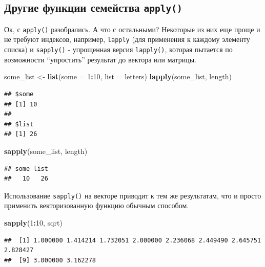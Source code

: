 \documentclass[
]{book}
\newenvironment{Shaded}{\begin{snugshade}}{\end{snugshade}}
\newcommand{\DataTypeTok}[1]{\textcolor[rgb]{0.13,0.29,0.53}{#1}}
\newcommand{\DecValTok}[1]{\textcolor[rgb]{0.00,0.00,0.81}{#1}}
\newcommand{\KeywordTok}[1]{\textcolor[rgb]{0.13,0.29,0.53}{\textbf{#1}}}
\newcommand{\NormalTok}[1]{#1}
\newcommand{\OperatorTok}[1]{\textcolor[rgb]{0.81,0.36,0.00}{\textbf{#1}}}
\newcommand{\StringTok}[1]{\textcolor[rgb]{0.31,0.60,0.02}{#1}}
\begin{document}
\hypertarget{apply_other}{%
\subsection{\texorpdfstring{Другие функции семейства \texttt{apply()}}{Другие функции семейства apply()}}\label{apply_other}}

Ок, с \texttt{apply()} разобрались. А что с остальными? Некоторые из них еще проще и не требуют индексов, например, \texttt{lapply} (для применения к каждому элементу списка) и \texttt{sapply()} - упрощенная версия \texttt{lapply()}, которая пытается по возможности ``упростить'' результат до вектора или матрицы.

\begin{Shaded}
\begin{Highlighting}[]
\NormalTok{some_list <-}\StringTok{ }\KeywordTok{list}\NormalTok{(}\DataTypeTok{some =} \DecValTok{1}\OperatorTok{:}\DecValTok{10}\NormalTok{, }\DataTypeTok{list =}\NormalTok{ letters)}
\KeywordTok{lapply}\NormalTok{(some_list, length)}
\end{Highlighting}
\end{Shaded}

\begin{verbatim}
## $some
## [1] 10
## 
## $list
## [1] 26
\end{verbatim}

\begin{Shaded}
\begin{Highlighting}[]
\KeywordTok{sapply}\NormalTok{(some_list, length)}
\end{Highlighting}
\end{Shaded}

\begin{verbatim}
## some list 
##   10   26
\end{verbatim}

Использование \texttt{sapply()} на векторе приводит к тем же результатам, что и просто применить векторизованную функцию обычным способом.

\begin{Shaded}
\begin{Highlighting}[]
\KeywordTok{sapply}\NormalTok{(}\DecValTok{1}\OperatorTok{:}\DecValTok{10}\NormalTok{, sqrt)}
\end{Highlighting}
\end{Shaded}

\begin{verbatim}
##  [1] 1.000000 1.414214 1.732051 2.000000 2.236068 2.449490 2.645751 2.828427
##  [9] 3.000000 3.162278
\end{verbatim}
\end{document}
